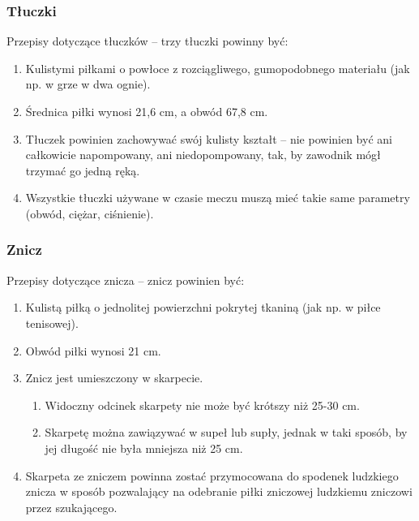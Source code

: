 \documentclass[12pt]{article}
\begin{document}
\subsubsection{Tłuczki}
Przepisy dotyczące tłuczków -- trzy tłuczki powinny być:

\begin{enumerate}
	\item Kulistymi piłkami o powłoce z rozciągliwego, gumopodobnego materiału
	      (jak np. w grze w dwa ognie).

	\item Średnica piłki wynosi 21,6 cm, a obwód 67,8 cm.

	\item Tłuczek powinien zachowywać swój kulisty kształt -- nie powinien być
	      ani całkowicie napompowany, ani niedopompowany, tak, by zawodnik mógł
	      trzymać go jedną ręką.

	\item Wszystkie tłuczki używane w czasie meczu muszą mieć takie same
	      parametry (obwód, ciężar, ciśnienie).
\end{enumerate}

\subsubsection{Znicz}
Przepisy dotyczące znicza -- znicz powinien być:

\begin{enumerate}
	\item Kulistą piłką o jednolitej powierzchni pokrytej tkaniną (jak np. w
	      piłce tenisowej).

	\item Obwód piłki wynosi 21 cm.

	\item Znicz jest umieszczony w skarpecie.
	      \begin{enumerate}
		      \item Widoczny odcinek skarpety nie może być krótszy niż 25-30 cm.

		      \item Skarpetę można zawiązywać w supeł lub supły, jednak w taki sposób,
		            by jej długość nie była mniejsza niż 25 cm.
	      \end{enumerate}
	\item Skarpeta ze zniczem powinna zostać przymocowana do spodenek ludzkiego
	      znicza w sposób pozwalający na odebranie piłki zniczowej ludzkiemu
	      zniczowi przez szukającego.
\end{enumerate}
\end{document}
